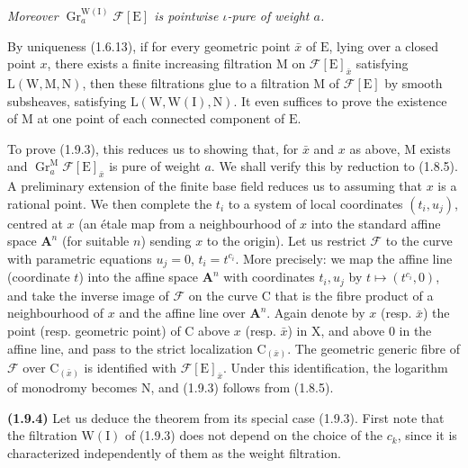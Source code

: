 \documentclass[11pt,leqno]{article}
\newcommand{\Page}[1]{\ifvmode\noindent\else\unskip\ \fi{\footnotesize\textcolor{gray}{[p.\,#1]}}\ \ignorespaces}
\begin{document}
\textit{Moreover \(\operatorname{Gr}_a^{\mathrm{W}(\mathrm{I})}\mathscr{F}[\mathrm{E}]\) is pointwise \(\iota\)-pure of weight \(a\).}

By uniqueness (1.6.13), if for every geometric point \(\bar{x}\) of \(\mathrm{E}\), lying over a closed point \(x\), there exists a finite increasing filtration \(\mathrm{M}\) on \(\mathscr{F}[\mathrm{E}]_{\bar{x}}\) satisfying \(\mathrm{L}(\mathrm{W},\mathrm{M},\mathrm{N})\), then these filtrations glue to a filtration \(\mathrm{M}\) of \(\mathscr{F}[\mathrm{E}]\) by smooth subsheaves, satisfying \(\mathrm{L}(\mathrm{W},\mathrm{W}(\mathrm{I}),\mathrm{N})\). It even suffices to prove the existence of \(\mathrm{M}\) at one point of each connected component of \(\mathrm{E}\).

To prove (1.9.3), this reduces us to showing that, for \(\bar{x}\) and \(x\) as above, \(\mathrm{M}\) exists and \(\operatorname{Gr}_a^{\mathrm{M}}\mathscr{F}[\mathrm{E}]_{\bar{x}}\) is pure of weight \(a\). We shall verify this by reduction to (1.8.5). A preliminary extension of the finite base field reduces us to assuming that \(x\) is a rational point. We then complete the \(t_i\) to a system of local coordinates \((t_i,u_j)\), centred at \(x\) (an étale map from a neighbourhood of \(x\) into the standard affine
\Page{181}
space \(\mathbf{A}^n\) (for suitable \(n\)) sending \(x\) to the origin). Let us restrict \(\mathscr{F}\) to the curve with parametric equations \(u_j=0\), \(t_i=t^{c_i}\). More precisely: we map the affine line (coordinate \(t\)) into the affine space \(\mathbf{A}^n\) with coordinates \(t_i,u_j\) by \(t\mapsto(t^{c_i},0)\), and take the inverse image of \(\mathscr{F}\) on the curve \(\mathrm{C}\) that is the fibre product of a neighbourhood of \(x\) and the affine line over \(\mathbf{A}^n\). Again denote by \(x\) (resp. \(\bar{x}\)) the point (resp. geometric point) of \(\mathrm{C}\) above \(x\) (resp. \(\bar{x}\)) in \(\mathrm{X}\), and above \(0\) in the affine line, and pass to the strict localization \(\mathrm{C}_{(\bar{x})}\). The geometric generic fibre of \(\mathscr{F}\) over \(\mathrm{C}_{(\bar{x})}\) is identified with \(\mathscr{F}[\mathrm{E}]_{\bar{x}}\). Under this identification, the logarithm of monodromy becomes \(\mathrm{N}\), and (1.9.3) follows from (1.8.5).

\textbf{(1.9.4)} Let us deduce the theorem from its special case (1.9.3). First note that the filtration \(\mathrm{W}(\mathrm{I})\) of (1.9.3) does not depend on the choice of the \(c_k\), since it is characterized independently of them as the weight filtration.
\end{document}
